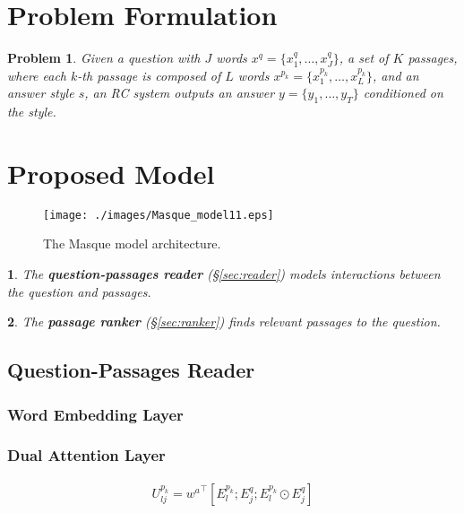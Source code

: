 \documentclass[11pt,a4paper]{article}
\theoremstyle{mydef}
\theoremstyle{myprob}
\newtheorem{problem}{Problem}
\newtheorem{layer1}{}
\begin{document}
\section{Problem Formulation}

\begin{problem}
\label{prob:prob}
Given a question with $J$ words $x^q = \{x^q_1, \ldots, x^q_J\}$, a set of $K$ passages, where each $k$-th passage is composed of $L$ words $x^{p_k} = \{x^{p_k}_1, \ldots, x^{p_k}_{L}\}$, and an answer style $s$, an RC system %
outputs an answer $y = \{y_1, \ldots, y_T \}$ conditioned on the style.
\end{problem}

\section{Proposed Model}

\begin{figure}[t!]
\centering
\texttt{[image: ./images/Masque\_model11.eps]}
\caption{The Masque model architecture.}
\label{fig:model}
\end{figure}

\begin{layer1}
The \textbf{question-passages reader} (\S\ref{sec:reader}) models interactions between the question and passages.
\end{layer1}

\begin{layer1}
The \textbf{passage ranker} (\S\ref{sec:ranker}) finds relevant passages to the question.
\end{layer1}

\subsection{Question-Passages Reader}

\subsubsection{Word Embedding Layer}

\subsubsection{Dual Attention Layer}

\begin{align}
U^{p_k}_{lj} = {w^a}^\top [ E^{p_k}_l; E^q_j; E^{p_k}_l \odot E^q_j ]
\end{align}
\end{document}
